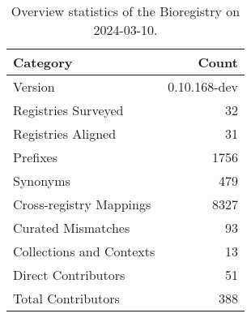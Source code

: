 \begin{table}
\caption{Overview statistics of the Bioregistry on 2024-03-10.}
\label{tab:bioregistry-summary}
\begin{tabular}{lr}
\toprule
Category & Count \\
\midrule
Version & 0.10.168-dev \\
Registries Surveyed & 32 \\
Registries Aligned & 31 \\
Prefixes & 1756 \\
Synonyms & 479 \\
Cross-registry Mappings & 8327 \\
Curated Mismatches & 93 \\
Collections and Contexts & 13 \\
Direct Contributors & 51 \\
Total Contributors & 388 \\
\bottomrule
\end{tabular}
\end{table}

